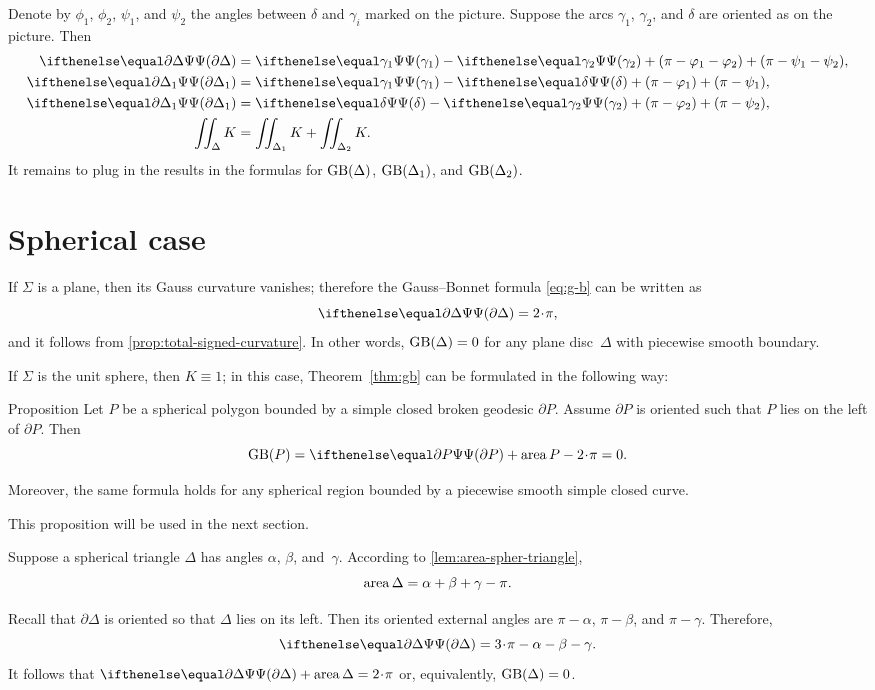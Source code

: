 Denote by $\phi_1$, $\phi_2$, $\psi_1$, and $\psi_2$ the angles between $\delta$ and $\gamma_i$ marked on the picture.
Suppose the arcs $\gamma_1$, $\gamma_2$, and $\delta$ are oriented as on the picture. 
Then
\begin{align*}
\tgc{\partial \Delta}&= \tgc{\gamma_1}-\tgc{\gamma_2}+(\pi-\phi_1-\phi_2)+(\pi-\psi_1-\psi_2),
\\
\tgc{\partial \Delta_1}&= \tgc{\gamma_1}-\tgc\delta+(\pi-\phi_1)+(\pi-\psi_1),
\\
\tgc{\partial \Delta_1}&= \tgc\delta-\tgc{\gamma_2}+(\pi-\phi_2)+(\pi-\psi_2),
\\
\iint_\Delta K&=\iint_{\Delta_1} K+\iint_{\Delta_2} K.
\end{align*}
It remains to plug in the results in the formulas for $\mathop{\rm GB}\nolimits(\Delta)$, $\mathop{\rm GB}\nolimits(\Delta_1)$, and $\mathop{\rm GB}\nolimits(\Delta_2)$.
\qeds

\section{Spherical case}

If $\Sigma$ is a plane, then its Gauss curvature vanishes;
therefore the Gauss--Bonnet formula \ref{eq:g-b} can be written as 
\[\tgc{\partial\Delta}=2\cdot \pi,\]
and it follows from \ref{prop:total-signed-curvature}.
In other words, $\mathop{\rm GB}\nolimits(\Delta)=0$ for any plane disc~$\Delta$ with piecewise smooth boundary.

If $\Sigma$ is the unit sphere, then $K\equiv1$;
in this case, Theorem~\ref{thm:gb} can be formulated in the following way:

\begin{thm}{Proposition}\label{prop:area-of-spher-polygon}
Let $P$ be a spherical polygon bounded by a simple closed broken geodesic $\partial P$.
Assume $\partial P$ is oriented such that $P$ lies on the left of $\partial P$.
Then 
\[\GB(P)=\tgc{\partial P}+\area P-2\cdot \pi=0.\]

Moreover, the same formula holds for any spherical region bounded by a piecewise smooth simple closed curve.
\end{thm}

This proposition will be used in the next section.

Suppose a spherical triangle $\Delta$ has angles 
$\alpha$, $\beta$, and~$\gamma$.
According to \ref{lem:area-spher-triangle},
\[\mathop{\rm area}\nolimits\Delta=\alpha+\beta+\gamma-\pi.\]

Recall that $\partial\Delta$ is oriented so that $\Delta$ lies on its left. 
Then its oriented external angles are  $\pi-\alpha$, $\pi-\beta$, and $\pi-\gamma$.
Therefore,
\[\tgc{\partial\Delta}=3\cdot\pi-\alpha-\beta-\gamma.\]
It follows that $\tgc{\partial\Delta}+\area \Delta=2\cdot\pi$ or, equivalently, $\mathop{\rm GB}\nolimits(\Delta)=0$.
 
